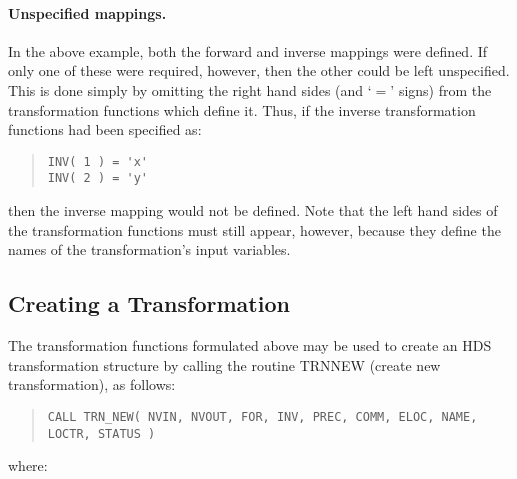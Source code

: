\documentclass[twoside,11pt]{article}
\newcommand{\xlabel}[1]{}
\renewcommand{\_}{\texttt{\symbol{95}}}
\newcommand{\name}[1]{\mbox{\small{#1}}}
\begin{document}
\paragraph{Unspecified mappings.}
In the above example, both the forward and inverse mappings were defined.
If only one of these were required, however, then the other could be left
unspecified.
This is done simply by omitting the right hand sides (and `$=$' signs) from
the transformation functions which define it.
Thus, if the inverse transformation functions had been specified as:

\begin{quote}
\begin{verbatim}
INV( 1 ) = 'x'
INV( 2 ) = 'y'
\end{verbatim}
\end{quote}

then the inverse mapping would not be defined.
Note that the left hand sides of the transformation functions must still
appear, however, because they define the names of the transformation's input
variables.


\subsection{\xlabel{creating_a_transformation}Creating a Transformation}
\label{section:simple:creating}

The transformation functions formulated above may be used to create an
\name{HDS} transformation structure by calling the routine \name{TRN\_NEW}
(create new transformation), as follows:

\begin{quote}\small
\begin{verbatim}
CALL TRN_NEW( NVIN, NVOUT, FOR, INV, PREC, COMM, ELOC, NAME, LOCTR, STATUS )
\end{verbatim}
\end{quote}

where:
\end{document}
